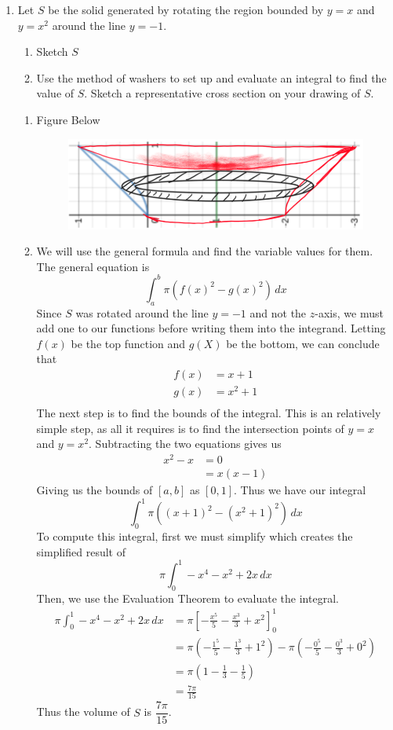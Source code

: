 \documentclass{article}
\begin{document}
\begin{enumerate}[label=\textbf{(8.\arabic*)}]
\item Let $S$ be the solid generated by rotating the region bounded by $y=x$ and $y=x^2$ around the line $y=-1$.
\begin{enumerate}
\item Sketch $S$
\item Use the method of washers to set up and evaluate an integral to find the value of $S$. Sketch a representative cross section on your drawing of $S$.
\end{enumerate}

\begin{enumerate}
\item Figure Below
\begin{figure}[H]
\centering
\includegraphics[scale=.5]{washer}
\end{figure}
\item We will use the general formula and find the variable values for them. The general equation is
\[\int_a^b\!\pi(f(x)^2-g(x)^2)\,dx\]
Since $S$ was rotated around the line $y=-1$ and not the $z$-axis, we must add one to our functions before writing them into the integrand. Letting $f(x)$ be the top function and $g(X)$ be the bottom, we can conclude  that
\begin{align*}
f(x) &= x+1\\
g(x) &= x^2+1\\
\end{align*}
The next step is to find the bounds of the integral. This is an relatively simple step, as all it requires is to find the intersection points of $y=x$ and $y=x^2$. Subtracting the two equations gives us
\begin{align*}
x^2-x &= 0\\
&= x(x-1)
\end{align*}
Giving us the bounds of $[a,b]$ as $[0,1]$. Thus we have our integral
\[\int_0^1\!\pi\left(\left(x+1\right)^2-\left(x^2+1\right)^2\right)\,dx\]
To compute this integral, first we must simplify which creates the simplified result of 
\[\pi\int_0^1\!-x^4-x^2+2x\,dx\]
Then, we use the Evaluation Theorem to evaluate the integral.
\begin{align*}
\pi\int_0^1\!-x^4-x^2+2x\,dx &= \pi\left[-\frac{x^5}{5}-\frac{x^3}{3}+x^2\right]_0^1\\
&= \pi\left(-\frac{1^5}{5}-\frac{1^3}{3}+1^2\right)-\pi\left(-\frac{0^5}{5}-\frac{0^3}{3}+0^2\right)\\
&= \pi\left(1-\frac{1}{3}-\frac{1}{5}\right)\\
&= \frac{7\pi}{15}
\end{align*}
Thus the volume of $S$ is $\dfrac{7\pi}{15}$.
\end{enumerate}


\end{enumerate}
\end{document}

